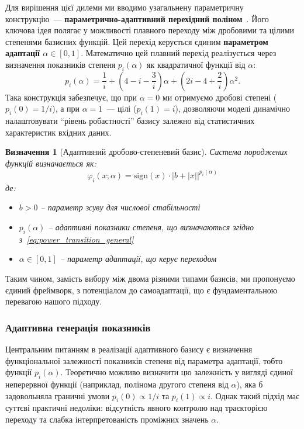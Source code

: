 \documentclass[12pt,a4paper]{article}
\newtheorem{definition}[theorem]{Визначення}
\begin{document}
Для вирішення цієї дилеми ми вводимо узагальнену параметричну конструкцію~--- \textbf{параметрично-адаптивний перехідний поліном}~\cite{zabolotnii2025adaptive_idea}. Його ключова ідея полягає у можливості плавного переходу між дробовими та цілими степенями базисних функцій. Цей перехід керується єдиним \textbf{параметром адаптації $\alpha \in [0, 1]$}. Математично цей плавний перехід реалізується через визначення показників степеня $p_i(\alpha)$ як квадратичної функції від $\alpha$:
\begin{equation}
	p_i(\alpha) = \frac{1}{i} + \left(4 - i - \frac{3}{i}\right)\alpha + \left(2i - 4 + \frac{2}{i}\right)\alpha^2.
	\label{eq:power_transition_general}
\end{equation}
Така конструкція забезпечує, що при $\alpha=0$ ми отримуємо дробові степені ($p_i(0) = 1/i$), а при $\alpha=1$~--- цілі ($p_i(1) = i$), дозволяючи моделі динамічно налаштовувати ``рівень робастності'' базису залежно від статистичних характеристик вхідних даних.

\begin{definition}[Адаптивний дробово-степеневий базис]
	\label{def:adaptive_basis}
	Система породжених функцій визначається як:
	\begin{equation}
		\varphi_i(x; \alpha) = \text{sign}(x) \cdot |b + |x||^{p_i(\alpha)}
	\end{equation}
	де:
	\begin{itemize}
		\item $b > 0$ -- параметр зсуву для числової стабільності
		\item $p_i(\alpha)$ -- адаптивні показники степеня, що визначаються згідно з~\eqref{eq:power_transition_general}
		\item $\alpha \in [0, 1]$ -- параметр адаптації, що керує переходом
	\end{itemize}
\end{definition}

Таким чином, замість вибору між двома різними типами базисів, ми пропонуємо єдиний фреймворк, з потенціалом до самоадаптації, що є фундаментальною перевагою нашого підходу.

\subsubsection{Адаптивна генерація показників}

Центральним питанням в реалізації адаптивного базису є визначення функціональної залежності показників степеня від параметра адаптації, тобто функції $p_i(\alpha)$. Теоретично можливо визначити цю залежність у вигляді єдиної неперервної функції (наприклад, полінома другого степеня від $\alpha$), яка б задовольняла граничні умови $p_i(0) \propto 1/i$ та $p_i(1) \propto i$. Однак такий підхід має суттєві практичні недоліки: відсутність явного контролю над траєкторією переходу та слабка інтерпретованість проміжних значень $\alpha$.
\end{document}
